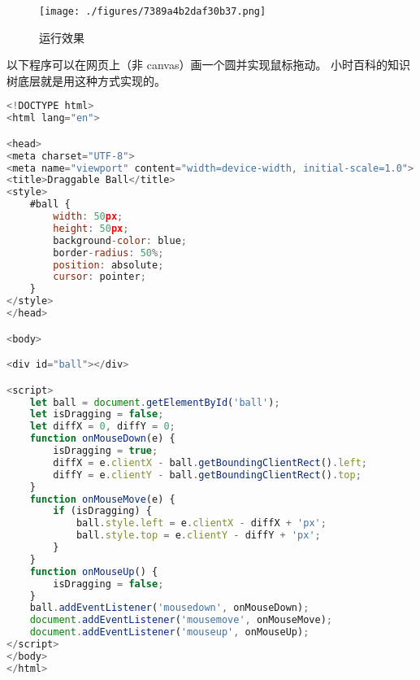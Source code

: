 
\begin{issues}
\issueDraft
\end{issues}

\begin{figure}[ht]
\centering
\texttt{[image: ./figures/7389a4b2daf30b37.png]}
\caption{运行效果} \label{fig_JSanim_3}
\end{figure}

以下程序可以在网页上（非 canvas）画一个圆并实现鼠标拖动。 小时百科的知识树底层就是用这种方式实现的。

\begin{lstlisting}[language=js,caption=drag\_ball.html]
<!DOCTYPE html>
<html lang="en">

<head>
<meta charset="UTF-8">
<meta name="viewport" content="width=device-width, initial-scale=1.0">
<title>Draggable Ball</title>
<style>
	#ball {
		width: 50px;
		height: 50px;
		background-color: blue;
		border-radius: 50%;
		position: absolute;
		cursor: pointer;
	}
</style>
</head>

<body>

<div id="ball"></div>

<script>
	let ball = document.getElementById('ball');
	let isDragging = false;
	let diffX = 0, diffY = 0;
	function onMouseDown(e) {
		isDragging = true;
		diffX = e.clientX - ball.getBoundingClientRect().left;
		diffY = e.clientY - ball.getBoundingClientRect().top;	
	}
	function onMouseMove(e) {
		if (isDragging) {
			ball.style.left = e.clientX - diffX + 'px';
			ball.style.top = e.clientY - diffY + 'px';
		}
	}
	function onMouseUp() {
		isDragging = false;
	}
	ball.addEventListener('mousedown', onMouseDown);
	document.addEventListener('mousemove', onMouseMove);
	document.addEventListener('mouseup', onMouseUp);
</script>
</body>
</html>
\end{lstlisting}
